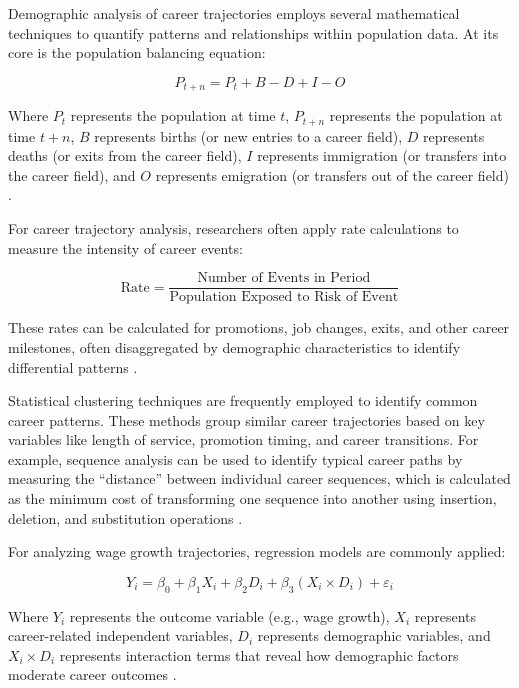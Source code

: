 \documentclass[../main.tex]{subfiles}
\begin{document}
 Demographic analysis of career trajectories employs several mathematical techniques to quantify patterns and relationships within population data. At its core is the population balancing equation:

\begin{equation}
P_{t+n} = P_t + B - D + I - O
\end{equation}

Where $P_t$ represents the population at time $t$, $P_{t+n}$ represents the population at time $t+n$, $B$ represents births (or new entries to a career field), $D$ represents deaths (or exits from the career field), $I$ represents immigration (or transfers into the career field), and $O$ represents emigration (or transfers out of the career field) \citep{land2019mathematical, vanwissen2016dissertation}.

 For career trajectory analysis, researchers often apply rate calculations to measure the intensity of career events:

\begin{equation}
\text{Rate} = \frac{\text{Number of Events in Period}}{\text{Population Exposed to Risk of Event}}
\end{equation}

These rates can be calculated for promotions, job changes, exits, and other career milestones, often disaggregated by demographic characteristics to identify differential patterns \citep{gale2024demographics, land2019mathematical}.

 Statistical clustering techniques are frequently employed to identify common career patterns. These methods group similar career trajectories based on key variables like length of service, promotion timing, and career transitions. For example, sequence analysis can be used to identify typical career paths by measuring the ``distance'' between individual career sequences, which is calculated as the minimum cost of transforming one sequence into another using insertion, deletion, and substitution operations \citep{nataraj2018career}.

 For analyzing wage growth trajectories, regression models are commonly applied:

\begin{equation}
Y_i = \beta_0 + \beta_1 X_i + \beta_2 D_i + \beta_3 (X_i \times D_i) + \varepsilon_i
\end{equation}

Where $Y_i$ represents the outcome variable (e.g., wage growth), $X_i$ represents career-related independent variables, $D_i$ represents demographic variables, and $X_i \times D_i$ represents interaction terms that reveal how demographic factors moderate career outcomes \citep{dol2023building, baker2023demographic}.
\end{document}
